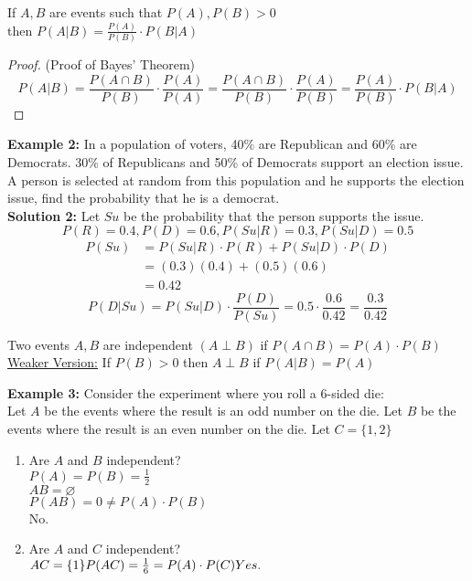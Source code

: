 \documentclass[12pt]{article}
\begin{document}
\begin{tcolorbox}[title = Theorem: Bayes' Theorem]
	If $A,B$ are events such that $P(A), P(B) > 0$\\
	then $P(A | B) = \frac{P(A)}{P(B)} \cdot P(B | A)$
\end{tcolorbox}

\begin{proof}
	(Proof of Bayes' Theorem)\\
	$$P(A | B) = \frac{P(A \cap B)}{P(B)}\cdot \frac{P(A)}{P(A)} = \frac{P(A \cap B)}{P(B)}\cdot \frac{P(A)}{P(B)} = \frac{P(A)}{P(B)} \cdot P(B | A)$$
\end{proof}

\textbf{Example 2:} In a population of voters, 40\% are Republican and 60\% are Democrats. 30\% of Republicans and 50\% of Democrats support an election issue. A person is selected at random from this population and he supports the election issue, find the probability that he is a democrat.\\

\textbf{Solution 2:} Let $Su$ be the probability that the person supports the issue.
$$P(R) = 0.4, P(D) = 0.6, P(Su | R) = 0.3, P(Su | D) = 0.5$$
\begin{align*}
	P(Su) &= P(Su | R) \cdot P(R) + P(Su | D) \cdot P(D)\\
	&= (0.3)(0.4) + (0.5)(0.6)\\
	&= 0.42
\end{align*}
$$P(D | Su) = P(Su | D) \cdot \frac{P(D)}{P(Su)} = 0.5 \cdot \frac{0.6}{0.42} = \frac{0.3}{0.42}$$

\begin{tcolorbox}[title= Definition: Independent Events]
	Two events $A,B$ are independent $(A \perp B)$ if $P(A \cap B) = P(A) \cdot P(B)$\\
	\underline{Weaker Version:} If $P(B) > 0$ then $A \perp B$ if $P(A | B) = P(A)$
\end{tcolorbox}

\textbf{Example 3:} Consider the experiment where you roll a 6-sided die:\\
Let $A$ be the events where the result is an odd number on the die. Let $B$ be the events where the result is an even number on the die. Let $C = \{ 1,2 \}$
\begin{enumerate}
	\item{Are $A$ and $B$ independent?\\
	$P(A) = P(B) = \frac{1}{2}$\\
	$AB = \varnothing$\\
	$P(AB) = 0 \neq P(A) \cdot P(B)$\\
	No.}
	\item{Are $A$ and $C$ independent?\\
	$AC = \{ 1 \}\\
	P(AC) = \frac{1}{6} = P(A) \cdot P(C)\\
	Yes.$}
\end{enumerate}
\end{document}
